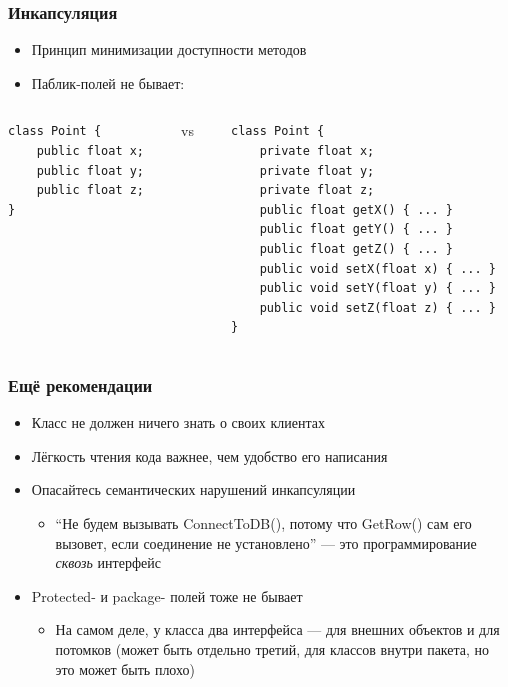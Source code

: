 \documentclass{../../slides-style}
\begin{document}
    \begin{frame}[fragile]
        \frametitle{Инкапсуляция}
        \begin{itemize}
            \item Принцип минимизации доступности методов
            \item Паблик-полей не бывает:
        \end{itemize}
        \begin{columns}
            \begin{column}{0.25\textwidth}
                \begin{verbatim}
class Point {
    public float x;
    public float y;
    public float z;
}
                \end{verbatim}
            \end{column}
            \begin{column}{0.1\textwidth}
                vs
            \end{column}
            \begin{column}{0.5\textwidth}
                \begin{verbatim}
class Point {
    private float x;
    private float y;
    private float z;
    public float getX() { ... }
    public float getY() { ... }
    public float getZ() { ... }
    public void setX(float x) { ... }
    public void setY(float y) { ... }
    public void setZ(float z) { ... }
}
                \end{verbatim}
            \end{column}
        \end{columns}
    \end{frame}

    \begin{frame}
        \frametitle{Ещё рекомендации}
        \begin{itemize}
            \item Класс не должен ничего знать о своих клиентах
            \item Лёгкость чтения кода важнее, чем удобство его написания
            \item Опасайтесь семантических нарушений инкапсуляции
            \begin{itemize}
                \item ``Не будем вызывать ConnectToDB(), потому что GetRow() сам его вызовет, если соединение не установлено'' --- это программирование \textit{сквозь} интерфейс
            \end{itemize}
            \item Protected- и package- полей тоже не бывает
            \begin{itemize}
                \item На самом деле, у класса два интерфейса --- для внешних объектов и для потомков (может быть отдельно третий, для классов внутри пакета, но это может быть плохо)
            \end{itemize}
        \end{itemize}
    \end{frame}
\end{document}
